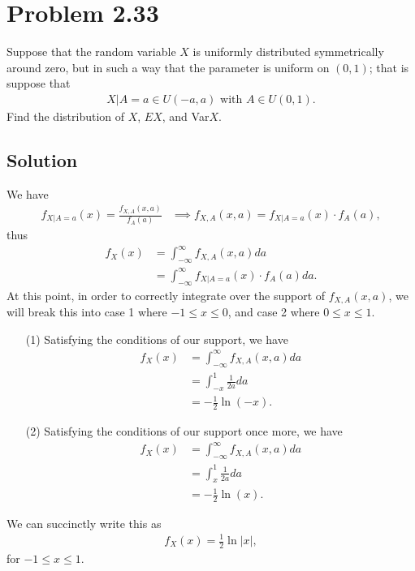 \documentclass[10pt,a4paper]{article}
\theoremstyle{theorem}
\theoremstyle{definition}
\begin{document}
\section*{Problem 2.33}
Suppose that the random variable $X$ is uniformly distributed symmetrically around zero, but in such a way that the parameter is uniform on $(0, 1)$; that is suppose that
\begin{align*}
X|A = a \in U(-a, a) \text{ with } A \in U(0, 1).
\end{align*}
Find the distribution of $X$, $EX$, and Var$X$.

\subsection*{Solution}
We have
\begin{align*}
f_{X|A = a}(x) = \frac{f_{X, A}(x, a)}{f_A(a)} &\implies f_{X, A}(x, a) = f_{X|A = a}(x) \cdot f_A(a),
\end{align*}
thus
\begin{align*}
f_X(x) &= \int_{-\infty}^\infty f_{X, A}(x, a) da\\
&= \int_{-\infty}^\infty f_{X|A = a}(x) \cdot f_A(a) da.
\end{align*}
At this point, in order to correctly integrate over the support of $f_{X, A}(x, a)$, we will break this into case 1 where $-1 \leq x \leq 0$, and case 2 where $0 \leq x \leq 1$.
\begin{enumerate}
\item[(1)] Satisfying the conditions of our support, we have
\begin{align*}
f_X(x) &= \int_{-\infty}^\infty f_{X, A}(x, a) da\\
&= \int_{-x}^1 \frac{1}{2a} da\\
&= - \frac{1}{2} \ln (-x).
\end{align*}

\item[(2)] Satisfying the conditions of our support once more, we have
\begin{align*}
f_X(x) &= \int_{-\infty}^\infty f_{X, A}(x, a) da\\
&= \int_{x}^1 \frac{1}{2a} da\\
&= - \frac{1}{2} \ln (x).
\end{align*}
\end{enumerate}
We can succinctly write this as 
\begin{align*}
\boxed{f_X(x) = \frac{1}{2} \ln |x|},
\end{align*}
for $-1 \leq x \leq 1$.
\end{document}
